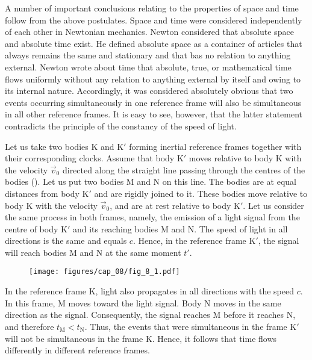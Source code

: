 A number of important conclusions relating to the properties of space and time follow from the above postulates. Space and time were considered independently of each other in Newtonian mechanics. Newton considered that absolute space and absolute time exist. He defined absolute space as a container of articles that always remains the same and stationary and that bas no relation to anything external. Newton wrote about time that absolute, true, or mathematical time flows uniformly without any relation to anything external by itself and owing to its internal nature. Accordingly, it was considered absolutely obvious that two events occurring simultaneously in one reference frame will also be simultaneous in all other reference frames. It is easy to see, however, that the latter statement contradicts the principle of the constancy of the speed of light.

Let us take two bodies K and K$'$ forming inertial reference frames together with their corresponding clocks. Assume that body K$'$ moves relative to body K with the velocity $\vec{v}_0$ directed along the straight line passing through the centres of the bodies (). Let us put two bodies M and N on this line. The bodies are at equal distances from body K$'$ and are rigidly joined to it. These bodies move relative to body K with the velocity $\vec{v}_0$, and are at rest relative to body K$'$. Let us consider the same process in both frames, namely, the emission of a light signal from the centre of body K$'$ and its reaching bodies M and N. The speed of light in all directions is the same and equals $c$. Hence, in the reference frame K$'$, the signal will reach bodies M and N at the same moment $t'$.

\begin{figure}[t]
	\begin{center}
		\texttt{[image: figures/cap\_08/fig\_8\_1.pdf]}
		\caption[]{}
		\label{fig:8_1}
	\end{center}
	\vspace{-0.8cm}
\end{figure}

In the reference frame K, light also propagates in all directions with the speed $c$. In this frame, M moves toward the light signal. Body N moves in the same direction as the signal. Consequently, the signal reaches M before it reaches N, and therefore $t_{\text{M}}<t_{\text{N}}$. Thus, the events that were simultaneous in the frame K$'$ will not be simultaneous in the frame K. Hence, it follows that time flows differently in different reference frames.

